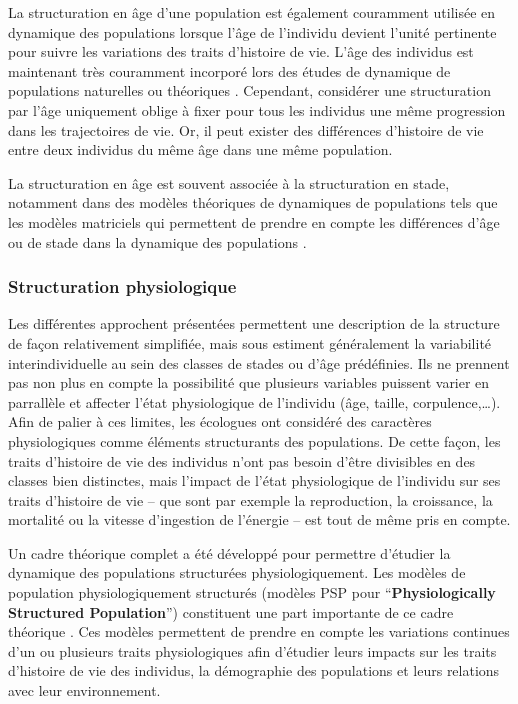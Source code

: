 La structuration en âge d'une population est également couramment utilisée en
dynamique des populations lorsque l'âge de l'individu devient l'unité pertinente
pour suivre les variations des traits d'histoire de vie. L'âge des individus est
maintenant très couramment incorporé lors des études de dynamique de populations
naturelles ou théoriques
\autocite[par
ex. ][]{coulson2008a,marteinsdottir2002a,worden2010a,robinson2013a}. 
Cependant, considérer une structuration par l'âge uniquement oblige à fixer pour
tous les individus une même progression dans les trajectoires de vie. Or, il
peut exister des différences d'histoire de vie entre deux individus du même âge
dans une même population.

La structuration en âge est souvent associée à la structuration en stade,
notamment dans des modèles théoriques de dynamiques de populations tels que les
modèles matriciels qui permettent de prendre en compte les différences d'âge ou
de stade dans la dynamique des populations
\autocites{caswell2001a,sarrazin2000demographic}. 

\subsubsection{Structuration physiologique}

Les différentes approchent présentées permettent une description de la structure
de façon relativement simplifiée, mais sous estiment généralement la variabilité
interindividuelle au sein des classes de stades ou d'âge prédéfinies. Ils ne
prennent pas non plus en compte la possibilité que plusieurs variables puissent
varier en parrallèle et affecter l'état physiologique de l'individu (âge,
taille, corpulence,\ldots). Afin de palier à ces limites, les écologues ont
considéré des caractères physiologiques comme éléments structurants des
populations. De cette façon, les traits d'histoire de vie des individus n'ont
pas besoin d'être divisibles en des classes bien distinctes, mais l'impact de
l'état physiologique de l'individu sur ses traits d'histoire de vie -- que sont
par exemple la reproduction, la croissance, la mortalité ou la vitesse
d'ingestion de l'énergie -- est tout de même pris en compte.

Un cadre théorique complet a été développé pour permettre d'étudier la dynamique
des populations structurées physiologiquement. Les modèles de
population physiologiquement structurés (modèles PSP pour
``\textbf{Physiologically Structured Population}'') constituent une part
importante de ce cadre théorique \autocites{metz1986a,de-roos1992a,de-roos1997a}. Ces modèles permettent de
prendre en compte les variations continues d'un ou plusieurs traits
physiologiques afin d'étudier leurs impacts sur les traits d'histoire de vie
des individus, la démographie des populations et leurs relations avec leur
environnement.

